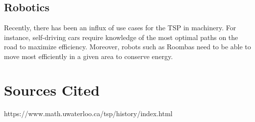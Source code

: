 \documentclass{article}
\begin{document}
\subsection{Robotics}     
Recently, there has been an influx of use cases for the TSP in machinery. For instance, self-driving cars require knowledge of the most optimal paths on the road to maximize efficiency. Moreover, robots such as Roombas need to be able to move most efficiently in a given area to conserve energy. \cite{Optessa}

\newpage
\section{Sources Cited}
\printbibliography
https://www.math.uwaterloo.ca/tsp/history/index.html
\end{document}
